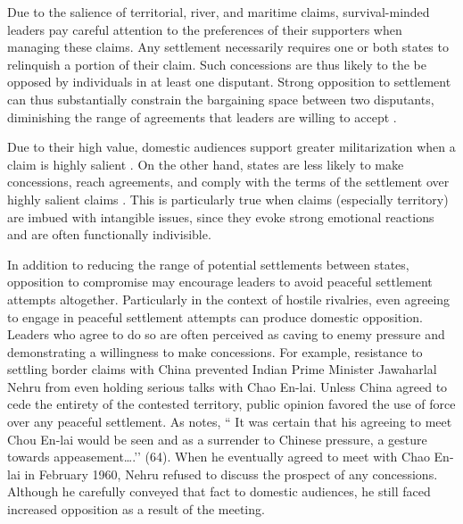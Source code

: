 \documentclass[../../dissertation.tex]{subfiles}
\begin{document}

Due to the salience of territorial, river, and maritime claims, survival-minded leaders pay careful attention to the preferences of their supporters when managing these claims. Any settlement necessarily requires one or both states to relinquish a portion of their claim. Such concessions are thus likely to the be opposed by individuals in at least one disputant. Strong opposition to settlement can thus substantially constrain the bargaining space between two disputants, diminishing the range of agreements that leaders are willing to accept \citep{fearon1994, putnam1988}. 

Due to their high value, domestic audiences support greater militarization when a claim is highly salient \citep{hensel2001, hensel2008, huth2009, mansbach1981, vasquez2009}. On the other hand, states are less likely to make concessions, reach agreements, and comply with the terms of the settlement over highly salient claims \citep{allee2006, mitchell2007, simmons2002, vasquez2009}. This is particularly true when claims (especially territory) are imbued with intangible issues, since they evoke strong emotional reactions and are often functionally indivisible.


In addition to reducing the range of potential settlements between states, opposition to compromise may encourage leaders to avoid peaceful settlement attempts altogether. Particularly in the context of hostile rivalries, even agreeing to engage in peaceful settlement attempts can produce domestic opposition. Leaders who agree to do so are often perceived as caving to enemy pressure and demonstrating a willingness to make concessions. For example, resistance to settling border claims with China prevented Indian Prime Minister Jawaharlal Nehru from even holding serious talks with Chao En-lai. Unless China agreed to cede the entirety of the contested territory, public opinion favored the use of force over any peaceful settlement. As \citet{maxwell1970} notes, `` It was certain that his agreeing to meet Chou En-lai would be seen and as a surrender to Chinese pressure, a gesture towards appeasement….’’ (64). When he eventually agreed to meet with Chao En-lai in February 1960, Nehru refused to discuss the prospect of any concessions. Although he carefully conveyed that fact to domestic audiences, he still faced increased opposition as a result of the meeting. 
\end{document}
